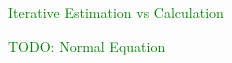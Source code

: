 \textcolor{green}{Iterative Estimation vs Calculation}

\textcolor{green}{TODO: Normal Equation}












